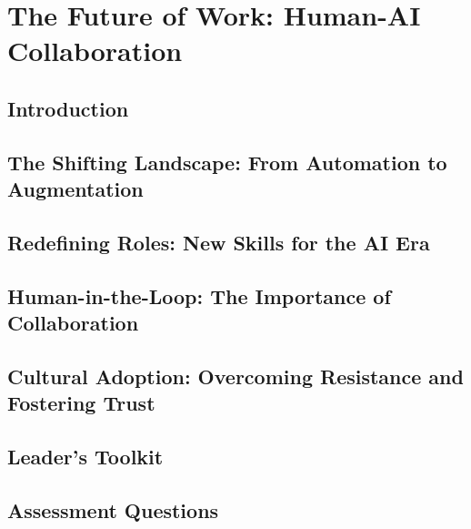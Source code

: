 \chapter{The Future of Work: Human-AI Collaboration}
\label{chap:future_of_work}

\section{Introduction}
\label{sec:future_of_work_introduction}

\section{The Shifting Landscape: From Automation to Augmentation}
\label{sec:shifting_landscape}

\section{Redefining Roles: New Skills for the AI Era}
\label{sec:redefining_roles}

\section{Human-in-the-Loop: The Importance of Collaboration}
\label{sec:human_in_the_loop}

\section{Cultural Adoption: Overcoming Resistance and Fostering Trust}
\label{sec:cultural_adoption}

\section{Leader's Toolkit}
\label{sec:future_of_work_leaders_toolkit}

\section{Assessment Questions}
\label{sec:future_of_work_assessment_questions}